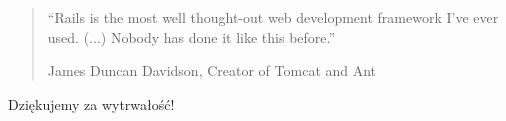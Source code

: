 \documentclass[12t]{beamer}
\begin{document}
\begin{frame}
  \begin{quote}
    “Rails is the most well thought-out web development framework I've
    ever used. (...) Nobody has done it like this before.”

    \begin{small}
      \hfill James Duncan Davidson, Creator of Tomcat and Ant
    \end{small}
  \end{quote}
\end{frame}

\begin{frame}
  \begin{center}
    \begin{Large}
      Dziękujemy za wytrwałość!
    \end{Large}
  \end{center}
\end{frame}
\end{document}
